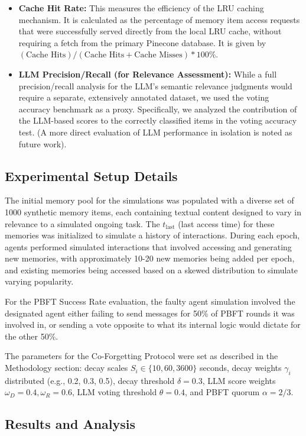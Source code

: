 \documentclass[conference]{IEEEtran}
\begin{document}
\begin{itemize}
    \item \textbf{Cache Hit Rate:} This measures the efficiency of the LRU caching mechanism. It is calculated as the percentage of memory item access requests that were successfully served directly from the local LRU cache, without requiring a fetch from the primary Pinecone database. It is given by $(\text{Cache Hits}) / (\text{Cache Hits} + \text{Cache Misses}) * 100\%$.
    \item \textbf{LLM Precision/Recall (for Relevance Assessment):} While a full precision/recall analysis for the LLM’s semantic relevance judgments would require a separate, extensively annotated dataset, we used the voting accuracy benchmark as a proxy. Specifically, we analyzed the contribution of the LLM-based scores to the correctly classified items in the voting accuracy test. (A more direct evaluation of LLM performance in isolation is noted as future work).
\end{itemize}

\subsection{Experimental Setup Details}

The initial memory pool for the simulations was populated with a diverse set of 1000 synthetic memory items, each containing textual content designed to vary in relevance to a simulated ongoing task. The $t_{\text{last}}$ (last access time) for these memories was initialized to simulate a history of interactions. During each epoch, agents performed simulated interactions that involved accessing and generating new memories, with approximately 10-20 new memories being added per epoch, and existing memories being accessed based on a skewed distribution to simulate varying popularity.

For the PBFT Success Rate evaluation, the faulty agent simulation involved the designated agent either failing to send messages for 50\% of PBFT rounds it was involved in, or sending a vote opposite to what its internal logic would dictate for the other 50\%.

The parameters for the Co-Forgetting Protocol were set as described in the Methodology section: decay scales $S_i \in \{10, 60, 3600\}$ seconds, decay weights $\gamma_i$ distributed (e.g., 0.2, 0.3, 0.5), decay threshold $\delta = 0.3$, LLM score weights $\omega_D = 0.4, \omega_R = 0.6$, LLM voting threshold $\theta = 0.4$, and PBFT quorum $\alpha = 2/3$.

\subsection{Results and Analysis}
\end{document}
